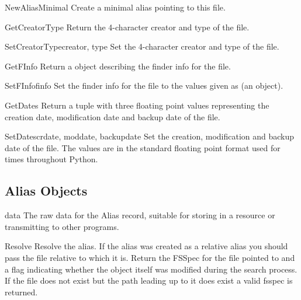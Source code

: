 \begin{methoddesc}[FSSpec]{NewAliasMinimal}{}
Create a minimal alias pointing to this file.
\end{methoddesc}

\begin{methoddesc}[FSSpec]{GetCreatorType}{}
Return the 4-character creator and type of the file.
\end{methoddesc}

\begin{methoddesc}[FSSpec]{SetCreatorType}{creator, type}
Set the 4-character creator and type of the file.
\end{methoddesc}

\begin{methoddesc}[FSSpec]{GetFInfo}{}
Return a  object describing the finder info for the file.
\end{methoddesc}

\begin{methoddesc}[FSSpec]{SetFInfo}{finfo}
Set the finder info for the file to the values given as 
(an  object).
\end{methoddesc}

\begin{methoddesc}[FSSpec]{GetDates}{}
Return a tuple with three floating point values representing the
creation date, modification date and backup date of the file.
\end{methoddesc}

\begin{methoddesc}[FSSpec]{SetDates}{crdate, moddate, backupdate}
Set the creation, modification and backup date of the file. The values
are in the standard floating point format used for times throughout
Python.
\end{methoddesc}


\subsection{Alias Objects \label{alias-objects}}

\begin{memberdesc}[Alias]{data}
The raw data for the Alias record, suitable for storing in a resource
or transmitting to other programs.
\end{memberdesc}

\begin{methoddesc}[Alias]{Resolve}{}
Resolve the alias. If the alias was created as a relative alias you
should pass the file relative to which it is. Return the FSSpec for
the file pointed to and a flag indicating whether the  object
itself was modified during the search process. If the file does
not exist but the path leading up to it does exist a valid fsspec
is returned.
\end{methoddesc}

